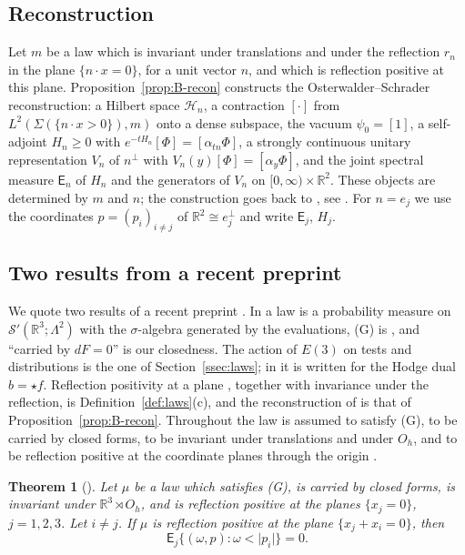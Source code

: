 \documentclass[11pt]{amsart}
\theoremstyle{plain}
\newtheorem{theorem}{Theorem}[section]
\theoremstyle{definition}
\theoremstyle{remark}
\numberwithin{equation}{section}
\newcommand{\R}{\mathbb{R}}
\newcommand{\cH}{\mathcal{H}}
\newcommand{\cS}{\mathcal{S}}
\newcommand{\Oh}{O_h}
\newcommand{\Eu}{E(3)}
\newcommand{\abs}[1]{\lvert #1\rvert}
\begin{document}
\subsection{Reconstruction}
Let $m$ be a law which is invariant under translations and under the reflection $r_n$ in the plane $\{n\cdot x=0\}$, for a unit vector $n$, and which is reflection positive at this plane. Proposition~\ref{prop:B-recon} constructs the Osterwalder--Schrader reconstruction: a Hilbert space $\cH_n$, a contraction $[\cdot]$ from $L^2(\Sigma(\{n\cdot x>0\}),m)$ onto a dense subspace, the vacuum ${\psi_0}=[1]$, a self-adjoint $H_n\ge0$ with $e^{-tH_n}[\Phi]=[\alpha_{tn}\Phi]$, a strongly continuous unitary representation $V_n$ of $n^\perp$ with $V_n(y)[\Phi]=[\alpha_y\Phi]$, and the joint spectral measure $\mathsf E_n$ of $H_n$ and the generators of $V_n$ on $[0,\infty)\times\R^2$. These objects are determined by $m$ and $n$; the construction goes back to \cite{OS73}, see \cite[Sect.~6.1]{GJ}. For $n=e_j$ we use the coordinates $p=(p_i)_{i\ne j}$ of $\R^2\cong e_j^\perp$ and write $\mathsf E_j$, $H_j$.

\subsection{Two results from a recent preprint}
We quote two results of a recent preprint \cite{S}. In \cite{S} a law is a probability measure on $\cS'(\R^3;\Lambda^2)$ with the $\sigma$-algebra generated by the evaluations, (G) is \cite[(1.2), p.~3]{S}, and ``carried by $dF=0$'' is our closedness. The action of $\Eu$ on tests and distributions \cite[Sect.~1.2, p.~2]{S} is the one of Section~\ref{ssec:laws}; in \cite[(18.1), p.~104]{S} it is written for the Hodge dual $b=\star f$. Reflection positivity at a plane \cite[(1.1), p.~2]{S}, together with invariance under the reflection, is Definition~\ref{def:laws}(c), and the reconstruction of \cite[Sect.~17]{S} is that of Proposition~\ref{prop:B-recon}. Throughout \cite[Sect.~18]{S} the law is assumed to satisfy (G), to be carried by closed forms, to be invariant under translations and under $\Oh$, and to be reflection positive at the coordinate planes through the origin \cite[p.~104]{S}.

\begin{theorem}[{\cite[Prop.~18.1, p.~104]{S}}]\label{thm:S-cone}
Let $\mu$ be a law which satisfies (G), is carried by closed forms, is invariant under $\R^3\rtimes\Oh$, and is reflection positive at the planes $\{x_j=0\}$, $j=1,2,3$. Let $i\ne j$. If $\mu$ is reflection positive at the plane $\{x_j+x_i=0\}$, then
\[
\mathsf E_j\big\{(\omega,p):\omega<\abs{p_i}\big\}=0 .
\]
\end{theorem}
\end{document}
